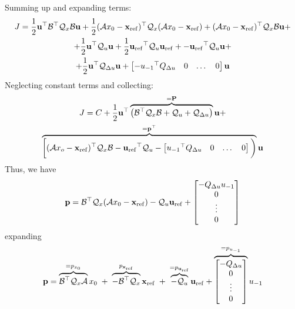 \documentclass[a4paper,12pt,fleqn]{article}
\newcommand{\PQP}{\mathbf{P}}
\newcommand{\qQP}{\mathbf{p}}
\newcommand{\varxvec}{\mathbf{x}}
\newcommand{\varuvec}{\mathbf{u}}
\newcommand{\baru}{u_{-1}}
\begin{document}
Summing up and expanding terms:
\begin{multline}
 J = 
 \frac{1}{2}\varuvec^\top \mathcal{B}^\top \mathcal{Q}_x \mathcal{B} \varuvec + 
 \frac{1}{2} (\mathcal{A}x_0 - \varxvec_{\rm ref})^\top \mathcal{Q}_x (\mathcal{A}x_0-\varxvec_{\rm ref}) +
 (\mathcal{A}x_0 -\varxvec_{\rm ref})^\top\mathcal{Q}_x \mathcal{B} \varuvec + \\
 + \frac{1}{2} \varuvec^\top \mathcal{Q}_u \varuvec +
 \frac{1}{2}{\varuvec_{\rm ref}}^\top \mathcal{Q}_u \varuvec_{\rm ref} + 
 -{\varuvec_{\rm ref}}^\top\mathcal{Q}_u \varuvec +\\ 
 +\frac{1}{2} \varuvec^\top \mathcal{Q}_{\Delta u} \varuvec +
\begin{bmatrix}
  -{\baru}^\top Q_{\Delta u} & 0 & \dots  & 0
 \end{bmatrix} \varuvec 
\end{multline}
Neglecting constant terms and collecting:
\begin{multline}
 J = C + \frac{1}{2} \varuvec^\top \overbrace{\big(\mathcal{B}^\top \mathcal{Q}_x \mathcal{B} + \mathcal{Q}_u + \mathcal{Q}_{\Delta u}\big)} ^{=\PQP}\varuvec + \\
 \overbrace{\bigg [(\mathcal{A}x_o - \varxvec_{\rm ref})^\top \mathcal{Q}_x \mathcal{B} -{\varuvec_{\rm ref}}^\top\mathcal{Q}_u -
 \begin{bmatrix}
  {\baru}^\top Q_{\Delta u} & 0 & \dots  & 0
 \end{bmatrix}\bigg)}^{=\qQP^\top} \varuvec
\end{multline}
Thus, we have
\begin{equation}
 \qQP = \mathcal{B}^\top \mathcal{Q}_x(\mathcal{A}x_0 - \varxvec_{\rm ref}) - \mathcal{Q}_u\varuvec_{\rm ref} + 
  \begin{bmatrix}
 -Q_{\Delta u} \baru \\ 0 \\ \vdots \\0
 \end{bmatrix}
\end{equation}
expanding
\begin{equation}
 \qQP = \overbrace{\mathcal{B}^\top \mathcal{Q}_x\mathcal{A}}^{=p_{x_0}}x_0  \;+\; \overbrace{-\mathcal{B}^\top \mathcal{Q}_x}^{p_{\varxvec_{\rm ref}}}\varxvec_{\rm ref}\;+\; \overbrace{-\mathcal{Q}_u}^{=p_{\varuvec_{\rm ref}}}\varuvec_{\rm ref} + 
\overbrace{
  \begin{bmatrix}
 -Q_{\Delta u} \\ 0 \\ \vdots \\0
 \end{bmatrix}
}^{=p_{\baru}}
\baru
\end{equation}
\end{document}
